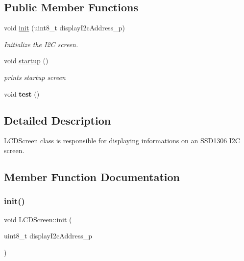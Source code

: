 \subsection*{Public Member Functions}
\begin{DoxyCompactItemize}
\item 
void \hyperlink{class_l_c_d_screen_af0c80235093457010a949bf1b649b919}{init} (uint8\+\_\+t display\+I2c\+Address\+\_\+p)
\begin{DoxyCompactList}\small\item\em Initialize the I2C screen. \end{DoxyCompactList}\item 
\mbox{\label{class_l_c_d_screen_a5e55c4d461d3f19f8864c6d5c9ca2ff4}} 
void \hyperlink{class_l_c_d_screen_a5e55c4d461d3f19f8864c6d5c9ca2ff4}{startup} ()
\begin{DoxyCompactList}\small\item\em prints startup screen \end{DoxyCompactList}\item 
\mbox{\label{class_l_c_d_screen_af5a86cbd7d28162e607ae15c6c5c7a2c}} 
void {\bfseries test} ()
\end{DoxyCompactItemize}


\subsection{Detailed Description}
\hyperlink{class_l_c_d_screen}{L\+C\+D\+Screen} class is responsible for displaying informations on an S\+S\+D1306 I2C screen. 

\subsection{Member Function Documentation}
\mbox{\label{class_l_c_d_screen_af0c80235093457010a949bf1b649b919}} 
\subsubsection{\texorpdfstring{init()}{init()}}
{\footnotesize\ttfamily void L\+C\+D\+Screen\+::init (\begin{DoxyParamCaption}\item[{uint8\+\_\+t}]{display\+I2c\+Address\+\_\+p }\end{DoxyParamCaption})}



